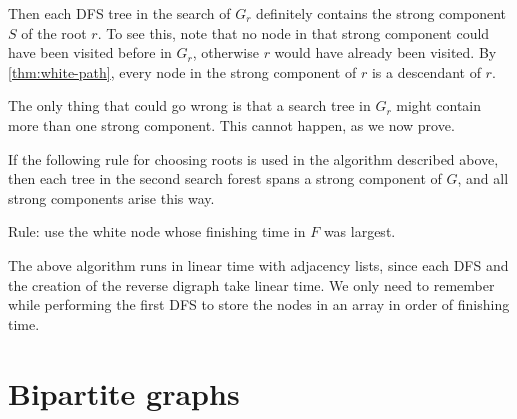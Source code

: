 Then each DFS tree in the search of $G_r$ definitely contains the strong
component $S$ of the root $r$. To see this, note that no node in that
strong component could have been visited before in $G_r$, otherwise $r$
would have already been visited. By \cref{thm:white-path}, every
node in the strong component of $r$ is a descendant of $r$.

The only thing that could go wrong is that a search tree in $G_r$
might contain more than one strong component. This cannot happen,
as we now prove.

\begin{Theorem} \label{thm:scc-alg} 
If the following rule for choosing roots is used in the algorithm
described above, then each tree in the second search forest spans a
strong component of $G$, and all strong components arise this way.

Rule: use the white node whose finishing time in $F$ was largest.
\end{Theorem}

%

The above algorithm runs in linear time with adjacency lists, since each
DFS and the creation of the reverse digraph take linear time. We only
need to remember  while performing the first DFS to store the nodes in
an array in order of finishing time. 

\section{Bipartite graphs}


